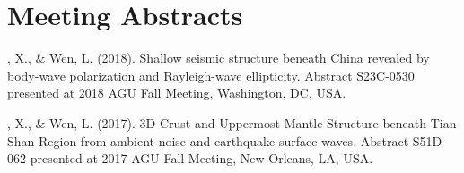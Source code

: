 \section*{Meeting Abstracts}
\begin{etaremune}
\item
    \Xiao, X., \& Wen, L. (2018).
    Shallow seismic structure beneath China revealed by body-wave polarization and Rayleigh-wave ellipticity. 
    Abstract S23C-0530 presented at 2018 AGU Fall Meeting, Washington, DC, USA.
\item
    \Xiao, X., \& Wen, L. (2017).
    3D Crust and Uppermost Mantle Structure beneath Tian Shan Region from ambient noise and earthquake surface waves. 
    Abstract S51D-062 presented at 2017 AGU Fall Meeting, New Orleans, LA, USA.
\end{etaremune}
